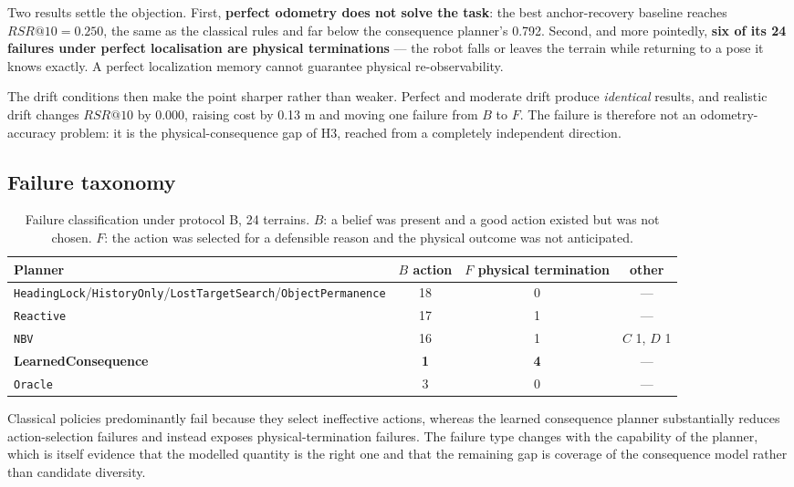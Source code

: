 \documentclass[utf8]{FrontiersinHarvard}
\begin{document}
Two results settle the objection. First, \textbf{perfect odometry does not solve the
task}: the best anchor-recovery baseline reaches $RSR@10 = 0.250$, the same as the
classical rules and far below the consequence planner's 0.792. Second, and more
pointedly, \textbf{six of its 24 failures under perfect localisation are physical
terminations} --- the robot falls or leaves the terrain while returning to a pose it
knows exactly. A perfect localization memory cannot guarantee physical re-observability.

The drift conditions then make the point sharper rather than weaker. Perfect and
moderate drift produce \emph{identical} results, and realistic drift changes $RSR@10$ by
0.000, raising cost by 0.13 m and moving one failure from $B$ to $F$. The failure is
therefore not an odometry-accuracy problem: it is the physical-consequence gap of H3,
reached from a completely independent direction.

\subsection{Failure taxonomy}

\begin{table}[h]
\caption{Failure classification under protocol B, 24 terrains. $B$: a belief was present
and a good action existed but was not chosen. $F$: the action was selected for a
defensible reason and the physical outcome was not anticipated.}
\label{tab:taxonomy}
\begin{tabular}{lccc}
\toprule
Planner & $B$ action & $F$ physical termination & other \\
\midrule
\texttt{HeadingLock}/\texttt{HistoryOnly}/\texttt{LostTargetSearch}/\texttt{ObjectPermanence} & 18 & 0 & --- \\
\texttt{Reactive} & 17 & 1 & --- \\
\texttt{NBV} & 16 & 1 & $C$ 1, $D$ 1 \\
\textbf{LearnedConsequence} & \textbf{1} & \textbf{4} & --- \\
\texttt{Oracle} & 3 & 0 & --- \\
\bottomrule
\end{tabular}
\end{table}

Classical policies predominantly fail because they select ineffective actions, whereas
the learned consequence planner substantially reduces action-selection failures and
instead exposes physical-termination failures. The failure type changes with the
capability of the planner, which is itself evidence that the modelled quantity is the
right one and that the remaining gap is coverage of the consequence model rather than
candidate diversity.
\end{document}
